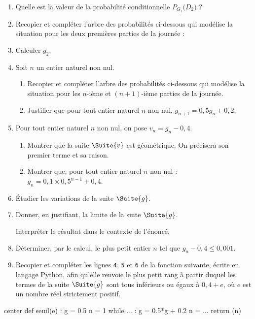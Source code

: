 \begin{enumerate}
	\item Quelle est la valeur de la probabilité conditionnelle $P_{G_1} \big(D_2\big)$ ?
	\item Recopier et compléter l'arbre des probabilités ci-dessous qui modélise la situation pour les deux premières parties de la journée :
	
	\begin{Centrage}
	\end{Centrage}
	\item Calculer $g_2$.
	\item Soit $n$ un entier naturel non nul.
	\begin{enumerate}
		\item Recopier et compléter l'arbre des probabilités ci-dessous qui modélise la situation pour les \mbox{$n$-ième} et $(n+1)$-ième parties de la journée.
		
		\begin{Centrage}
			\ArbreProbasTikz[PositionProbas=auto]{$G_n$/\numdots/$g_n$,$G_{n+1}$/\numdots/,$D_{n+1}$/\numdots/,$D_n$/\numdots/,$G_{n+1}$/\numdots/,$D_{n+1}$/\numdots/}
		\end{Centrage}
		\item Justifier que pour tout entier naturel $n$ non nul, $g_{n+1}= 0,5g_n+0,2$.
	\end{enumerate}
	\item Pour tout entier naturel $n$ non nul, on pose $v_n=g_n-0,4$.
	\begin{enumerate}
		\item Montrer que la suite $\Suite{v}$ est géométrique. On précisera son premier terme et sa raison.
		\item Montrer que, pour tout entier naturel $n$ non nul : $g_n = 0,1 \times 0,5^{n-1}+0,4$.
	\end{enumerate}
	\item Étudier les variations de la suite $\Suite{g}$.
	\item Donner, en justifiant, la limite de la suite $\Suite{g}$.
	
	Interpréter le résultat dans le contexte de l'énoncé. 
	\item Déterminer, par le calcul, le plus petit entier $n$ tel que $g_n - 0,4 \leqslant 0,001$.
	\item Recopier et compléter les lignes \texttt{4}, \texttt{5} et \texttt{6} de la fonction suivante, écrite en langage \textsf{Python}, afin qu'elle renvoie le plus petit rang à partir duquel les termes de la suite $\Suite{g}$ sont tous inférieurs ou égaux à
	$0,4 + e$, où $e$ est un nombre réel strictement positif.
\end{enumerate}

\begin{CodePythonLstAlt}[Largeur=7cm,Filigrane]{center}
def seuil(e) :
	g = 0.5
	n = 1
	while ... :
		g = 0.5*g + 0.2
		n = ...
	return (n)
\end{CodePythonLstAlt}